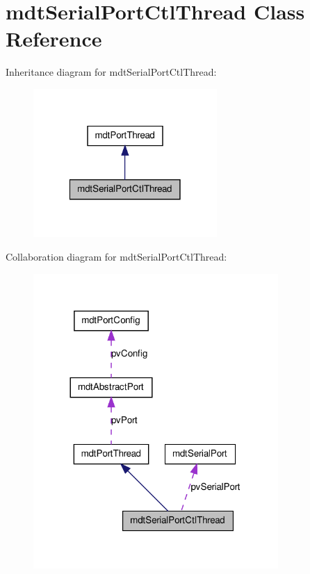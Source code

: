 \hypertarget{classmdt_serial_port_ctl_thread}{
\section{mdtSerialPortCtlThread Class Reference}
\label{classmdt_serial_port_ctl_thread}
}


Inheritance diagram for mdtSerialPortCtlThread:\nopagebreak
\begin{figure}[H]
\begin{center}
\leavevmode
\includegraphics[width=198pt]{classmdt_serial_port_ctl_thread__inherit__graph}
\end{center}
\end{figure}


Collaboration diagram for mdtSerialPortCtlThread:\nopagebreak
\begin{figure}[H]
\begin{center}
\leavevmode
\includegraphics[width=264pt]{classmdt_serial_port_ctl_thread__coll__graph}
\end{center}
\end{figure}
